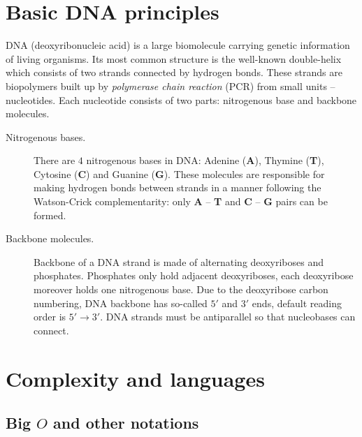 \section{Basic DNA principles}
\label{sec:DNA}
	
	DNA (deoxyribonucleic acid) is a large biomolecule carrying genetic information of living organisms. Its most common structure is the well-known double-helix which consists of two strands connected by hydrogen bonds. These strands are biopolymers built up by {\em polymerase chain reaction} (PCR) from small units -- nucleotides. Each nucleotide consists of two parts: nitrogenous base and backbone molecules.
	\begin{description}
		\item[Nitrogenous bases.] There are $4$ nitrogenous bases in DNA: Adenine ({\bf A}), Thymine ({\bf T}), Cytosine ({\bf C}) and Guanine ({\bf G}). These molecules are responsible for making hydrogen bonds between strands in a manner following the Watson-Crick complementarity: only {\bf A} -- {\bf T} and {\bf C} -- {\bf G} pairs can be formed.
		\item[Backbone molecules.] Backbone of a DNA strand is made of alternating deoxyriboses and phosphates. Phosphates only hold adjacent deoxyriboses, each deoxyribose moreover holds one nitrogenous base. Due to the deoxyribose carbon numbering, DNA backbone has so-called $5'$ and $3'$ ends, default reading order is $5'\rightarrow 3'$. DNA strands must be antiparallel so that nucleobases can connect.
	\end{description}

\section{Complexity and languages}
\label{sec:minf}
	
	\subsection{Big $O$ and other notations}
		
